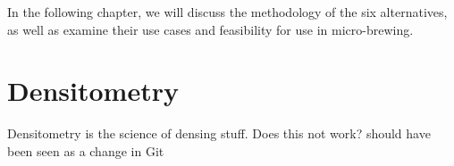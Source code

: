 \documentclass[twoside]{ctuthesis}
\theoremstyle{plain}
\theoremstyle{definition}
\theoremstyle{note}
\begin{document}
In the following chapter, we will discuss the methodology of the six alternatives, as well as examine their use cases and feasibility for use in micro-brewing.
\section{Densitometry}
Densitometry is the science of densing stuff. Does this not work? should have been seen as a change in Git














%

%







\appendix
\end{document}
